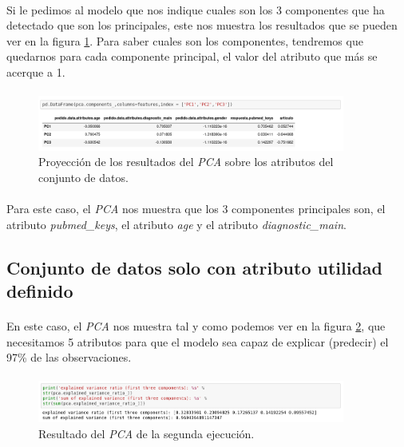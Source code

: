\paragraph{}
Si le pedimos al modelo que nos indique cuales son los 3 componentes que ha detectado que son los principales, este nos muestra los resultados que se pueden ver en la figura \ref{pcaOneAtributos}. Para saber cuales son los componentes, tendremos que quedarnos para cada componente principal, el valor del atributo que más se acerque a 1.

\paragraph{}
\begin{figure}[!htb]
  \centering
    \includegraphics[width=0.9\textwidth]{images/resultados_procesado_de_datos_pca1_atributos.png}
    \caption{Proyección de los resultados del \textit{PCA} sobre los atributos del conjunto de datos.}
  \label{pcaOneAtributos}
\end{figure}

\paragraph{}
Para este caso, el \textit{PCA} nos muestra que los 3 componentes principales son, el atributo \textit{pubmed\_keys}, el atributo \textit{age} y el atributo \textit{diagnostic\_main}.

\subsection{Conjunto de datos solo con atributo utilidad definido}

\paragraph{}
En este caso, el \textit{PCA} nos muestra tal y como podemos ver en la figura \ref{pcaTwoResult}, que necesitamos 5 atributos para que el modelo sea capaz de explicar (predecir) el 97\% de las observaciones.

\paragraph{}
\begin{figure}[!htb]
  \centering
    \includegraphics[width=0.9\textwidth]{images/resultados_procesado_de_datos_pca2_result.png}
    \caption{Resultado del \textit{PCA} de la segunda ejecución.}
  \label{pcaTwoResult}
\end{figure}

